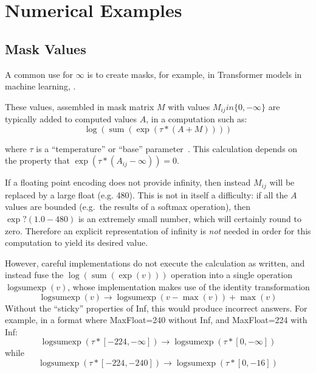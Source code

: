 \documentclass{article}
\begin{document}


\appendix
\section{Numerical Examples}

\subsection{Mask Values}
\def\sumop{\operatorname{sum}}
\def\logsumexp{\operatorname{logsumexp}}
A common use for $\infty$ is to create masks, for example, in Transformer models in machine learning, \cite{torchtext:inf}.

These values, assembled in mask matrix $M$ with values $M_{ij} in \{0,-\infty\}$ are typically added to computed values $A$,  in a computation such as:
\[
\log(\sumop(\exp(\tau * (A + M))))
\]

where $\tau$ is a ``temperature'' or ``base'' parameter~\cite{softmax-wikipedia}.
This calculation depends on the property that $\exp(\tau*(A_{ij}-\infty))=0$.

If a floating point encoding does not provide infinity, then instead $M_{ij}$ will be replaced by a large float (e.g. 480).  This is not in itself a difficulty: if all the $A$ values are bounded (e.g.\ the results of a softmax operation), then $\exp?(1.0-480)$ is an extremely small number, which will certainly round to zero.
Therefore an explicit representation of infinity is {\em not} needed in order for this computation to yield its desired value.

However, careful implementations do not execute the calculation as written,
and instead fuse the $\log(\sumop(\exp(v)))$ operation into a single operation $\logsumexp(v)$,
whose implementation makes use of the identity transformation
\[
\logsumexp(v) \rightarrow \logsumexp(v-\max(v)) + \max(v)
\]
Without the ``sticky'' properties of Inf, this would produce incorrect answers.
For example, in a format where MaxFloat=240 without Inf, and MaxFloat=224 with Inf:
\[
\logsumexp(\tau*[-224,-\infty]) \rightarrow \logsumexp(\tau*[0,-\infty])
\]
while
\[
\logsumexp(\tau*[-224,-240]) \rightarrow \logsumexp(\tau*[0,-16])
\]
\end{document}
